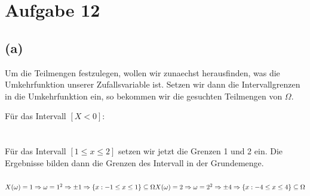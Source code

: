 \documentclass[a4paper]{scrartcl}
\begin{document}
\section*{Aufgabe 12}
\subsection*{(a)}
Um die Teilmengen festzulegen, wollen wir zunaechst herausfinden, was die Umkehrfunktion unserer Zufallsvariable ist. Setzen wir dann die Intervallgrenzen in die Umkehrfunktion ein, so bekommen wir die gesuchten Teilmengen von $\Omega$.

Für das Intervall $\left[X < 0 \right]$:\\
\\
\\
Für das Intervall $\left[ 1 \leq x \leq 2 \right]$ setzen wir jetzt die Grenzen 1 und 2 ein. Die Ergebnisse bilden dann die Grenzen des Intervall in der Grundemenge.\\\\
$
X(\omega) = 1 \Rightarrow \omega = 1^2 \Rightarrow \pm 1 \Rightarrow \lbrace x:-1 \leq x \leq 1 \rbrace \subseteq \Omega\\
X(\omega) = 2 \Rightarrow \omega = 2^2 \Rightarrow \pm 4 \Rightarrow \lbrace x: -4 \leq x \leq 4 \rbrace \subseteq \Omega
$
\end{document}
